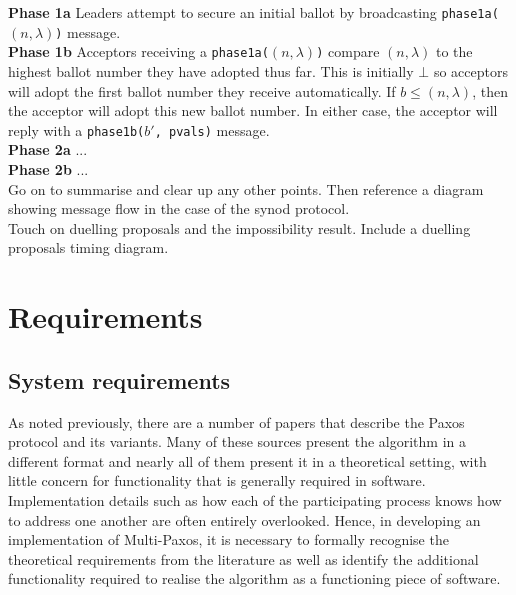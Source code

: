 \textbf{Phase 1a} Leaders attempt to secure an initial ballot by broadcasting \texttt{phase1a($\left( n, \lambda \right)$)} message.\\

\textbf{Phase 1b} Acceptors receiving a \texttt{phase1a($\left( n, \lambda \right)$)} compare $\left( n, \lambda \right)$ to the highest ballot number they have adopted thus far. This is initially $\bot$ so acceptors will adopt the first ballot number they receive automatically. If $b \leq \left( n, \lambda \right)$, then the acceptor will adopt this new ballot number. In either case, the acceptor will reply with a \texttt{phase1b($b'$, pvals)} message. \\

\textbf{Phase 2a} ... \\

\textbf{Phase 2b} ... \\

Go on to summarise and clear up any other points. Then reference a diagram showing message flow in the case of the synod protocol. \\

Touch on duelling proposals and the impossibility result. Include a duelling proposals timing diagram.




\section{Requirements}

\subsection{System requirements}

As noted previously, there are a number of papers that describe the Paxos protocol and its variants. Many of these sources present the algorithm in a different format and nearly all of them present it in a theoretical setting, with little concern for functionality that is generally required in software. Implementation details such as how each of the participating process knows how to address one another are often entirely overlooked. Hence, in developing an implementation of Multi-Paxos, it is necessary to formally recognise the theoretical requirements from the literature as well as identify the additional functionality required to realise the algorithm as a functioning piece of software. \\

